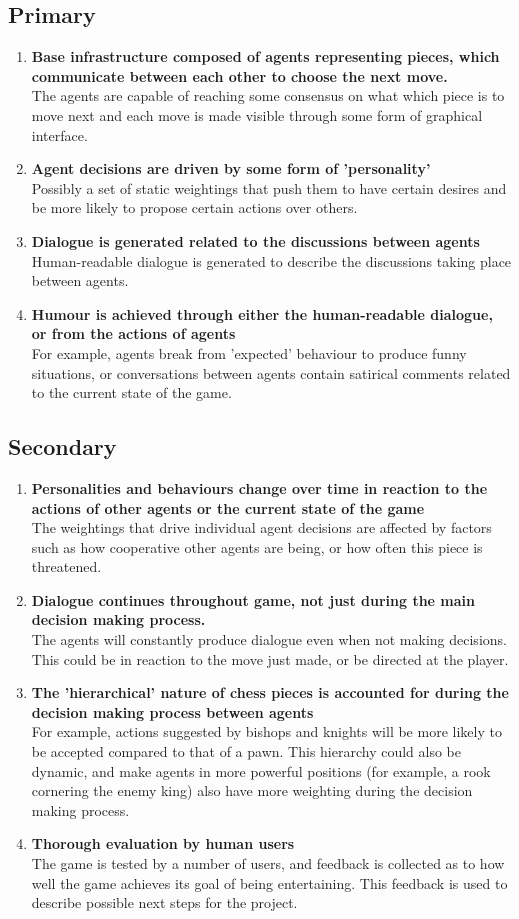 \documentclass[12pt]{extarticle}
\newcommand\descitem[1]{\item{\bfseries #1}\\}
\begin{document}
\subsection*{Primary}
\begin{enumerate}
		\descitem{Base infrastructure composed of agents representing pieces, which communicate between each other to choose the next move.}
		The agents are capable of reaching some consensus on what which piece is to move next and each move is made visible through some form of graphical interface.

		\descitem{Agent decisions are driven by some form of 'personality'}
		Possibly a set of static weightings that push them to have certain desires and be more likely to propose certain actions over others.

		\descitem{Dialogue is generated related to the discussions between agents}
		Human-readable dialogue is generated to describe the discussions taking place between agents.

		\descitem{Humour is achieved through either the human-readable dialogue, or from the actions of agents}
		For example, agents break from 'expected' behaviour to produce funny situations, or conversations between agents contain satirical comments related to the current state of the game.

\end{enumerate}

\subsection*{Secondary}

\begin{enumerate}
		\descitem{Personalities and behaviours change over time in reaction to the actions of other agents or the current state of the game}
		The weightings that drive individual agent decisions are affected by factors such as how cooperative other agents are being, or how often this piece is threatened.

		\descitem{Dialogue continues throughout game, not just during the main decision making process.}
		The agents will constantly produce dialogue even when not making decisions. This could be in reaction to the move just made, or be directed at the player.

		\descitem{The 'hierarchical' nature of chess pieces is accounted for during the decision making process between agents}
		For example, actions suggested by bishops and knights will be more likely to be accepted compared to that of a pawn. This hierarchy could also be dynamic, and make agents in more powerful positions (for example, a rook cornering the enemy king) also have more weighting during the decision making process.

		\descitem{Thorough evaluation by human users}
		The game is tested by a number of users, and feedback is collected as to how well the game achieves its goal of being entertaining. This feedback is used to describe possible next steps for the project.

\end{enumerate}
\end{document}

